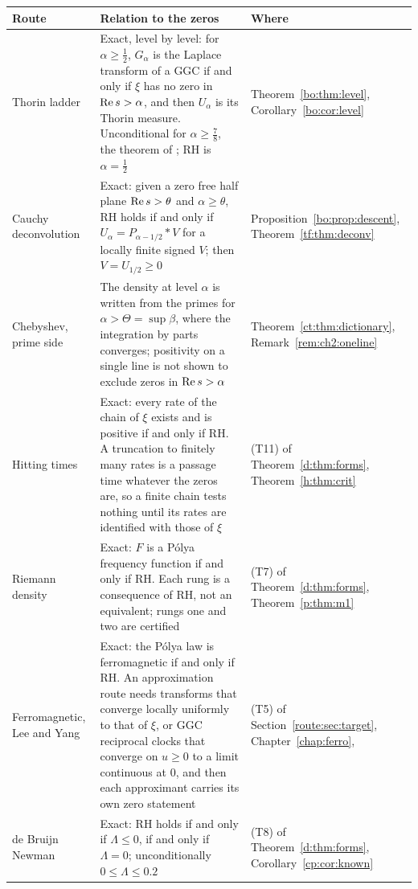 \begin{table}[t]
\centering\footnotesize
\begin{tabular}{@{}p{}p{}p{}@{}}
\toprule
Route & Relation to the zeros & Where \\
\midrule
Thorin ladder & Exact, level by level: for $\alpha\ge\frac12$, $G_\alpha$ is the Laplace transform of a GGC if and only if $\xi$ has no zero in $\operatorname{Re} s>\alpha$, and then $U_\alpha$ is its Thorin measure. Unconditional for $\alpha\ge\frac78$, the theorem of \cite{OAI26a}; RH is $\alpha=\frac12$ & Theorem~\ref{bo:thm:level}, Corollary~\ref{bo:cor:level} \\
Cauchy deconvolution & Exact: given a zero free half plane $\operatorname{Re} s>\theta$ and $\alpha\ge\theta$, RH holds if and only if $U_\alpha=P_{\alpha-1/2}*V$ for a locally finite signed $V$; then $V=U_{1/2}\ge0$ & Proposition~\ref{bo:prop:descent}, Theorem~\ref{tf:thm:deconv} \\
Chebyshev, prime side & The density at level $\alpha$ is written from the primes for $\alpha>\Theta=\sup\beta$, where the integration by parts converges; positivity on a single line is not shown to exclude zeros in $\operatorname{Re} s>\alpha$ & Theorem~\ref{ct:thm:dictionary}, Remark~\ref{rem:ch2:oneline} \\
Hitting times & Exact: every rate of the chain of $\xi$ exists and is positive if and only if RH. A truncation to finitely many rates is a passage time whatever the zeros are, so a finite chain tests nothing until its rates are identified with those of $\xi$ & (T11) of Theorem~\ref{d:thm:forms}, Theorem~\ref{h:thm:crit} \\
Riemann density & Exact: $F$ is a Pólya frequency function if and only if RH. Each rung is a consequence of RH, not an equivalent; rungs one and two are certified & (T7) of Theorem~\ref{d:thm:forms}, Theorem~\ref{p:thm:m1} \\
Ferromagnetic, Lee and Yang & Exact: the Pólya law is ferromagnetic if and only if RH. An approximation route needs transforms that converge locally uniformly to that of $\xi$, or GGC reciprocal clocks that converge on $u\ge0$ to a limit continuous at $0$, and then each approximant carries its own zero statement & (T5) of Section~\ref{route:sec:target}, Chapter~\ref{chap:ferro}, \cite{Newman75} \\
de Bruijn Newman & Exact: RH holds if and only if $\Lambda\le0$, if and only if $\Lambda=0$; unconditionally $0\le\Lambda\le0.2$ \cite{RodgersTao,PT21} & (T8) of Theorem~\ref{d:thm:forms}, Corollary~\ref{cp:cor:known} \\

\end{tabular}
\end{table}
